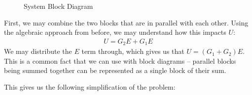 \begin{example}
\begin{figure}[H]
\begin{tikzpicture}[x=0.75pt,y=0.75pt,yscale=-0.7,xscale=0.7]
\end{tikzpicture}
    
    \caption{System Block Diagram}
    \label{fig:block diagram example}
\end{figure}
First, we may combine the two blocks that are in parallel with each other. Using the algebraic approach from before, we may understand how this impacts $U$:
\begin{gather}
    U=G_2E+G_1E
\end{gather}
We may distribute the $E$ term through, which gives us that $U=(G_1+G_2)E$. This is a common fact that we can use with block diagrams -- parallel blocks being summed together can be represented as a single block of their sum.

This gives us the following simplification of the problem:
\begin{figure}[H]
    \centering



\begin{tikzpicture}[x=0.75pt,y=0.75pt,yscale=-0.8,xscale=0.8]


\end{tikzpicture}
\end{figure}
\end{example}
